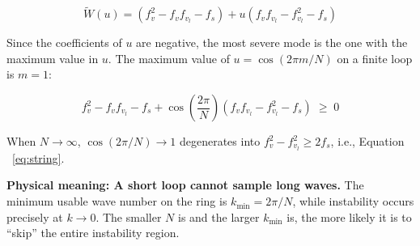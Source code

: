 \documentclass[11pt,a4paper,openany]{book}
\numberwithin{equation}{chapter}
\numberwithin{figure}{chapter}
\numberwithin{table}{chapter}
\begin{document}
\begin{equation}
\widetilde W(u) = \left(f_v^2-f_vf_{v_l}-f_s\right) + u\left(f_vf_{v_l}-f_{v_l}^2-f_s\right)
\end{equation}

Since the coefficients of $u$ are negative, the most severe mode is the one with the maximum value in $u$. The maximum value of $u=\cos(2\pi m/N)$ on a finite loop is $m=1$:










\begin{tcolorbox}[keybox,title=\textbf{Linear stability conditions for a single-vehicle loop as given by $N$}]

\begin{equation}
f_v^2 - f_vf_{v_l} - f_s + \cos\!\left(\frac{2\pi}{N}\right)\left(f_vf_{v_l}-f_{v_l}^2-f_s\right) \;\ge\; 0
\end{equation}

When $N\to\infty$, $\cos(2\pi/N)\to1$ degenerates into $f_v^2-f_{v_l}^2\ge2f_s$, i.e., Equation ~\eqref{eq:string}.







\end{tcolorbox}

\textbf{Physical meaning: A short loop cannot sample long waves.} The minimum usable wave number on the ring is $k_{\min}=2\pi/N$, while instability occurs precisely at $k\to0$. The smaller $N$ is and the larger $k_{\min}$ is, the more likely it is to “skip” the entire instability region.
\end{document}
